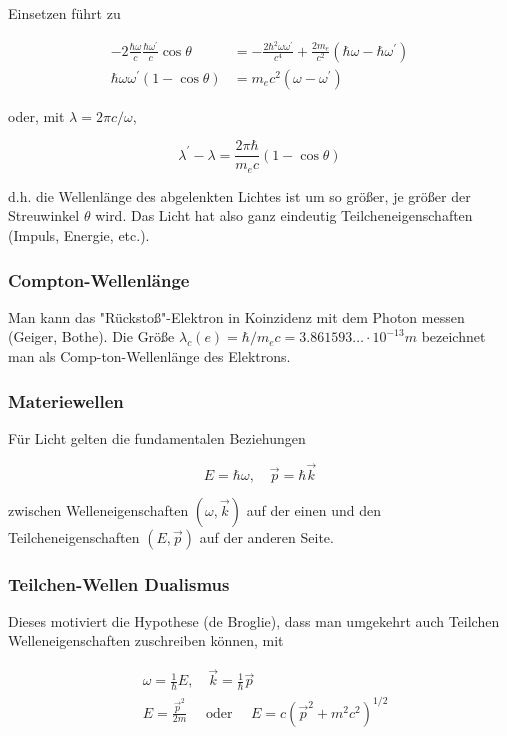 \documentclass[10pt, letterpaper]{article}
\begin{document}
Einsetzen führt zu

$$
\begin{aligned}
-2 \frac{\hbar \omega}{c} \frac{\hbar \omega^{\prime}}{c} \cos \theta & =-\frac{2 \hbar^{2} \omega \omega^{\prime}}{c^{4}}+\frac{2 m_{e}}{c^{2}}\left(\hbar \omega-\hbar \omega^{\prime}\right) \\
\hbar \omega \omega^{\prime}(1-\cos \theta) & =m_{e} c^{2}\left(\omega-\omega^{\prime}\right)
\end{aligned}
$$

oder, mit $\lambda=2 \pi c / \omega$,

$$
\lambda^{\prime}-\lambda=\frac{2 \pi \hbar}{m_{e} c}(1-\cos \theta)
$$

d.h. die Wellenlänge des abgelenkten Lichtes ist um so größer, je größer der Streuwinkel $\theta$ wird. Das Licht hat also ganz eindeutig Teilcheneigenschaften (Impuls, Energie, etc.).

\subsubsection*{Compton-Wellenlänge}
Man kann das "Rückstoß"-Elektron in Koinzidenz mit dem Photon messen (Geiger, Bothe). Die Größe $\lambda_{c}(e)=\hbar / m_{e} c=3.861593 \ldots \cdot 10^{-13} m$ bezeichnet man als Comp-ton-Wellenlänge des Elektrons.

\subsubsection*{Materiewellen}
Für Licht gelten die fundamentalen Beziehungen

$$
E=\hbar \omega, \quad \vec{p}=\hbar \vec{k}
$$

zwischen Welleneigenschaften $(\omega, \vec{k})$ auf der einen und den Teilcheneigenschaften $(E, \vec{p})$ auf der anderen Seite.

\subsubsection*{Teilchen-Wellen Dualismus}
Dieses motiviert die Hypothese (de Broglie), dass man umgekehrt auch Teilchen Welleneigenschaften zuschreiben können, mit

$$
\begin{aligned}
& \omega=\frac{1}{\hbar} E, \quad \vec{k}=\frac{1}{\hbar} \vec{p} \\
& E=\frac{\vec{p}^{2}}{2 m} \quad \text { oder } \quad E=c\left(\vec{p}^{2}+m^{2} c^{2}\right)^{1 / 2}
\end{aligned}
$$
\end{document}
